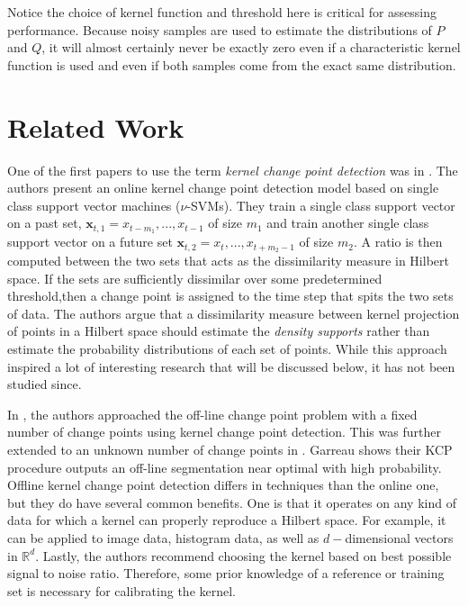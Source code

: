 Notice the choice of kernel function and threshold here is critical for assessing performance. Because noisy samples are used to estimate the distributions of $P$ and $Q$, it will almost certainly never be exactly zero even if a characteristic kernel function is used and even if both samples come from the exact same distribution.


\section{Related Work}

One of the first papers to use the term \textit{kernel change point detection} was in \cite{desobry2005online}. The authors present an online kernel change point detection model based on single class support vector machines ($\nu$-SVMs). They train a single class support vector on a past set, $\mathbf{x}_{t,1}={x_{t-m_1},...,x_{t-1}}$ of size $m_1$ and train another single class support vector on a future set $\mathbf{x}_{t,2}={x_t,...,x_{t+m_2-1}}$ of size $m_2$. A ratio is then computed between the two sets that acts as the dissimilarity measure in Hilbert space. If the sets are sufficiently dissimilar over some predetermined threshold,then a change point is assigned to the time step that spits the two sets of data. The authors argue that a dissimilarity measure between kernel projection of points in a Hilbert space should estimate the \textit{density supports} rather than estimate the probability distributions of each set of points. While this approach inspired a lot of interesting research that will be discussed below, it has not been studied since.

In \cite{harchaoui2007retrospective}, the authors approached the off-line change point problem with a fixed number of change points using kernel change point detection. This was further extended to an unknown number of change points in \cite{arlot2012kernel}. Garreau shows their KCP procedure outputs an off-line segmentation near optimal with high probability. Offline kernel change point detection differs in techniques than the online one, but they do have several common benefits. One is that it operates on any kind of data for which a kernel can properly reproduce a Hilbert space. For example, it can be applied to image data, histogram data, as well as $d-$dimensional vectors in $\mathbb{R}^d$. Lastly, the authors recommend choosing the kernel based on best possible signal to noise ratio. Therefore, some prior knowledge of a reference or training set is necessary for calibrating the kernel. 

